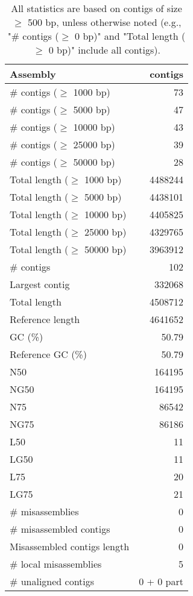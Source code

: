 \documentclass[12pt,a4paper]{article}
\begin{document}
\begin{table}[ht]
\begin{center}
\caption{All statistics are based on contigs of size $\geq$ 500 bp, unless otherwise noted (e.g., "\# contigs ($\geq$ 0 bp)" and "Total length ($\geq$ 0 bp)" include all contigs).}
\begin{tabular}{|l*{1}{|r}|}
\hline
Assembly & contigs \\ \hline
\# contigs ($\geq$ 1000 bp) & 73 \\ \hline
\# contigs ($\geq$ 5000 bp) & 47 \\ \hline
\# contigs ($\geq$ 10000 bp) & 43 \\ \hline
\# contigs ($\geq$ 25000 bp) & 39 \\ \hline
\# contigs ($\geq$ 50000 bp) & 28 \\ \hline
Total length ($\geq$ 1000 bp) & 4488244 \\ \hline
Total length ($\geq$ 5000 bp) & 4438101 \\ \hline
Total length ($\geq$ 10000 bp) & 4405825 \\ \hline
Total length ($\geq$ 25000 bp) & 4329765 \\ \hline
Total length ($\geq$ 50000 bp) & 3963912 \\ \hline
\# contigs & 102 \\ \hline
Largest contig & 332068 \\ \hline
Total length & 4508712 \\ \hline
Reference length & 4641652 \\ \hline
GC (\%) & 50.79 \\ \hline
Reference GC (\%) & 50.79 \\ \hline
N50 & 164195 \\ \hline
NG50 & 164195 \\ \hline
N75 & 86542 \\ \hline
NG75 & 86186 \\ \hline
L50 & 11 \\ \hline
LG50 & 11 \\ \hline
L75 & 20 \\ \hline
LG75 & 21 \\ \hline
\# misassemblies & 0 \\ \hline
\# misassembled contigs & 0 \\ \hline
Misassembled contigs length & 0 \\ \hline
\# local misassemblies & 5 \\ \hline
\# unaligned contigs & 0 + 0 part \\ \hline

\end{tabular}
\end{center}
\end{table}
\end{document}
